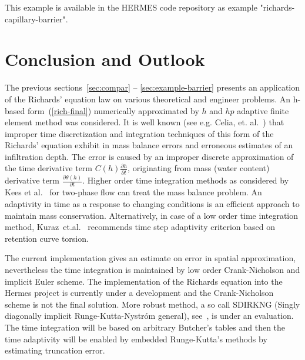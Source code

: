 \documentclass[final,3p,times,twocolumn]{elsarticle}
\begin{document}
This example is available in the HERMES code repository \cite{hermes-repo}
as example "richards-capillary-barrier".



\section{Conclusion and Outlook} \label{sec:8}

The previous sections~\ref{sec:compar} -- \ref{sec:example-barrier} presents an application
 of the Richards' equation law on various theoretical and engineer problems. An h-based form~(\ref{rich-final})  numerically approximated by $h$ and $hp$ adaptive finite element method was considered. It is well known (see e.g. Celia, et. al.~\cite{celia}) that improper time discretization and integration techniques of this form of the Richards' equation exhibit in mass balance errors and erroneous estimates of an infiltration depth. 
The error is caused by an improper discrete approximation of the time derivative term $C(h)\frac{\partial h}{\partial t}$, originating from mass (water content) derivative term $\frac{\partial \theta(h)}{\partial t}$.
Higher order time integration methods as considered by Kees et al.~\cite{kees-time-integ} for two-phase flow can treat the mass balance problem. An adaptivity in time as a response to changing conditions is an efficient approach to maintain mass conservation.
Alternatively, in case of a low order time integration method,  Kuraz~et.al.~\cite{kuraz-jcam} recommends time step adaptivity criterion based on retention curve torsion.


The current implementation gives an estimate on error in  spatial approximation, nevertheless the time integration is maintained by 
low order Crank-Nicholson and implicit Euler scheme. The implementation of the Richards equation into the Hermes project is currently  under 
a development and the Crank-Nicholson scheme is not the final solution. More robust method, a so call SDIRKNG (Singly diagonally implicit Runge-Kutta-Nystr\'om  general), see~\cite{sdirk}, is under an evaluation. The time integration will be based on arbitrary Butcher's tables and then the time adaptivity will be enabled by embedded Runge-Kutta's methods by estimating truncation error.
\end{document}
